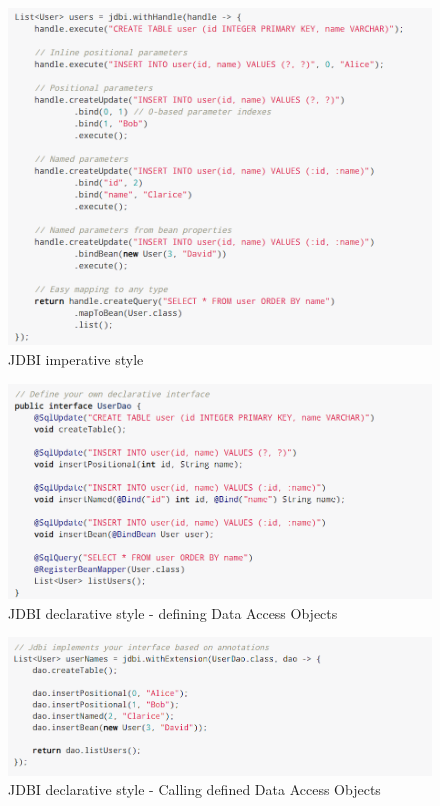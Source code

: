 \begin{figure}[H]
    \begin{center}
        \includegraphics[scale=0.5]{_figures/imperative.png}
        \caption{JDBI imperative style}
    \end{center}
\end{figure}

\begin{figure}[H]
    \begin{center}
        \includegraphics[scale=0.5]{_figures/declarative.png}
        \caption{JDBI declarative style - defining Data Access Objects}
    \end{center}
\end{figure}

\begin{figure}[H]
    \begin{center}
        \includegraphics[scale=0.5]{_figures/calling-declarative.png}
        \caption{JDBI declarative style - Calling defined Data Access Objects}
    \end{center}
\end{figure}

